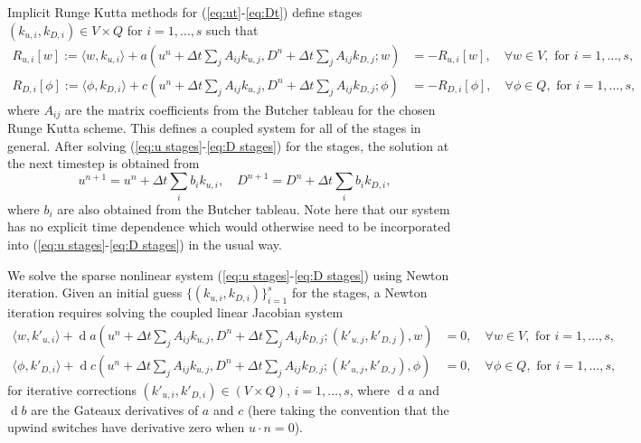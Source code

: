 \documentclass[a4paper]{article}
\DeclareMathOperator{\diff}{d}
\begin{document}
Implicit Runge Kutta methods for (\ref{eq:ut}-\ref{eq:Dt}) define
stages $(k_{u,i}, k_{D,i})\in V\times Q$ for $i=1,\ldots,s$ such that
\begin{align}
  \label{eq:u stages}
  R_{u,i}[w] := \langle w, k_{u,i} \rangle + a\left(u^n + \Delta t\sum_jA_{ij}k_{u,j},
  D^n + \Delta t\sum_jA_{ij}k_{D,j};w\right)
   & = -R_{u,i}[w],
  \quad \forall w \in V,\mbox{ for }i=1,\ldots,s, \\
  \label{eq:D stages}
  R_{D,i}[\phi] := \langle \phi, k_{D,i} \rangle + c\left(u^n + \Delta
  t\sum_jA_{ij}k_{u,j}, D^n + \Delta t\sum_jA_{ij}k_{D,j}; \phi\right)
  & = -R_{D,i}[\phi], \quad \forall \phi \in Q,\mbox{ for
  }i=1,\ldots,s,
\end{align}
where $A_{ij}$ are the matrix coefficients from the Butcher
tableau for the chosen Runge Kutta scheme. This defines a coupled
system for all of the stages in general. After solving
(\ref{eq:u stages}-\ref{eq:D stages}) for the stages, the solution
at the next timestep is obtained from
\begin{equation}
  u^{n+1} = u^n + \Delta t\sum_ib_i k_{u,i},\quad
  D^{n+1} = D^n + \Delta t\sum_ib_i k_{D,i},
\end{equation}
where $b_i$ are also obtained from the Butcher tableau. Note here
that our system has no explicit time dependence which would otherwise
need to be incorporated into (\ref{eq:u stages}-\ref{eq:D stages}) in
the usual way.

We solve the sparse nonlinear system (\ref{eq:u stages}-\ref{eq:D
  stages}) using Newton iteration. Given an initial guess $\{(k_{u,i},
k_{D,i})\}_{i=1}^s$ for the stages, a Newton iteration requires solving
the coupled linear Jacobian system
\begin{align}
  \label{eq:u J}
  \langle w, k'_{u,i} \rangle + \diff a\left(u^n + \Delta t\sum_jA_{ij}k_{u,j},
  D^n + \Delta t\sum_jA_{ij}k_{D,j};(k'_{u,j}, k'_{D,j}),
  w\right)
   & = 0,
  \quad \forall w \in V,\mbox{ for }i=1,\ldots,s, \\
  \label{eq:D J}
  \langle \phi, k'_{D,i} \rangle
  + \diff c\left(u^n + \Delta t\sum_jA_{ij}k_{u,j},
  D^n + \Delta t\sum_jA_{ij}k_{D,j};(k'_{u,j}, k'_{D,j}),
  \phi\right) & =
 0, \quad \forall \phi \in Q,\mbox{ for }i=1,\ldots,s,
\end{align}
for iterative corrections $(k'_{u,i}, k'_{D,i})\in (V\times Q)$,
$i=1,\ldots,s$, where $\diff a$ and $\diff b$ are the Gateaux
derivatives of $a$ and $c$ (here taking the convention that the upwind
switches have derivative zero when $u\cdot n=0$).
\end{document}
